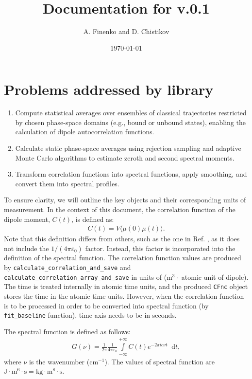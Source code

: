\documentclass[color]{article}
\title{Documentation for \libname v.0.1}
\author{A. Finenko and D. Chistikov}
\date{\today}
\newcommand*\diff{\mathop{}\!\mathrm{d}}
\newcommand{\intty}{\int\limits_{-\infty}^{+\infty}}
\begin{document}
\maketitle

\tableofcontents
\newpage 

\section{Problems addressed by library}
\label{sec:tasks}

\begin{enumerate}
\item Compute statistical averages over ensembles of classical trajectories restricted by chosen phase-space domains (e.g., bound or unbound states), enabling the calculation of dipole autocorrelation functions. 
\item Calculate static phase-space averages using rejection sampling and adaptive Monte Carlo algorithms to estimate zeroth and second spectral moments.
\item Transform correlation functions into spectral functions, apply smoothing, and convert them into spectral profiles.
\end{enumerate}


To ensure clarity, we will outline the key objects and their corresponding units of measurement. In the context of this document, the correlation function of the dipole moment, $C(t)$, is defined as:
\begin{gather}
    C(t) = V \langle \mu(0) \mu(t) \rangle.
\end{gather}
%
Note that this definition differs from others, such as the one in Ref. \cite{Chistikov2021}, as it does not include the 
$1/(4 \pi \varepsilon_0)$ factor. Instead, this factor is incorporated into the definition of the spectral function. The correlation function values are produced by \texttt{calculate\_correlation\_and\_save} and \texttt{calculate\_correlation\_array\_and\_save} in units of (m$^3 \cdot$ atomic unit of dipole). The time is treated internally in atomic time units, and the produced \texttt{CFnc} object stores the time in the atomic time units. However, when the correlation function is to be processed in order to be converted into spectral function (by \texttt{fit\_baseline} function), time axis needs to be in seconds.

The spectral function is defined as follows:
\begin{gather}
    G(\nu) = \frac{1}{2\pi} \frac{1}{4\pi \varepsilon_0} \intty C(t) e^{-2 \pi i c \nu t} \diff{t},
\end{gather}
%
where $\nu$ is the wavenumber (cm$^{-1}$). The values of spectral function are $\text{J} \cdot \text{m}^6 \cdot \text{s} = \text{kg} \cdot \text{m}^8 \cdot \text{s}$. 
\end{document}
